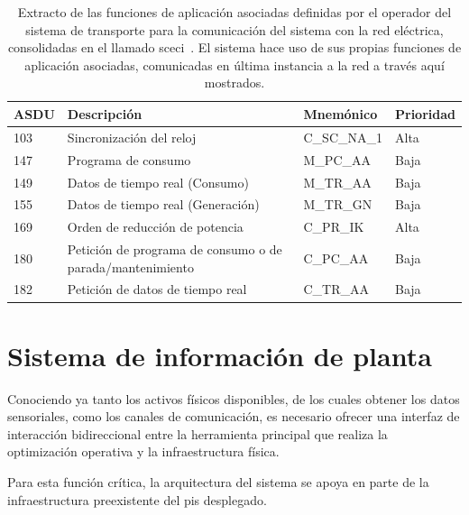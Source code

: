 \begin{table}[ht]
  \centering
  \begin{tabular}{|l|p{7.5cm}|l|l|}
    \hline
    ASDU & Descripción                                               & Mnemónico   & Prioridad \\
    \hline
    103  & Sincronización del reloj                                  & C\_SC\_NA\_1 & Alta     \\
    147  & Programa de consumo                                       & M\_PC\_AA    & Baja     \\
    149  & Datos de tiempo real (Consumo)                            & M\_TR\_AA    & Baja     \\
    155  & Datos de tiempo real (Generación)                         & M\_TR\_GN    & Baja     \\
    169  & Orden de reducción de potencia                            & C\_PR\_IK    & Alta     \\
    180  & Petición de programa de consumo o de parada/mantenimiento & C\_PC\_AA    & Baja     \\
    182  & Petición de datos de tiempo real                          & C\_TR\_AA    & Baja     \\
    \hline
  \end{tabular}
  \caption[Funciones de aplicación para la comunicación con la red eléctrica.]{Extracto de las funciones de aplicación asociadas definidas por el operador del sistema de transporte para la comunicación del sistema con la red eléctrica, consolidadas en el llamado \gls{sceci}~\cite{ree2009protocolo}. El sistema hace uso de sus propias funciones de aplicación asociadas, comunicadas en última instancia a la red a través aquí mostrados.}%
  \label{tab:funciones-de-aplicacion-red}
\end{table}

\section{Sistema de información de planta}%
\label{makereference3.4}

Conociendo ya tanto los activos físicos disponibles, de los cuales obtener los datos sensoriales, como los canales de comunicación, es necesario ofrecer una interfaz de interacción bidireccional entre la herramienta principal que realiza la optimización operativa y la infraestructura física.

Para esta función crítica, la arquitectura del sistema se apoya en parte de la infraestructura preexistente del \gls{pis} desplegado.

